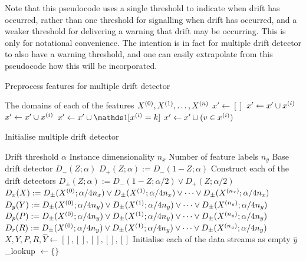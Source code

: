 Note that this pseudocode  uses a single threshold to indicate when drift has occurred, rather than one threshold for signalling when drift has occurred, and a weaker threshold for delivering a warning that drift may be occurring. This is only for notational convenience. The intention is in fact for multiple drift detector to also have a warning threshold, and one can easily extrapolate from this pseudocode how this will be incorporated.

\begin{algorithm}
    \caption{Preprocess features for multiple drift detector}
    \label{alg:mdd_preprocess}
    \begin{algorithmic}
        \Require The domains of each of the features $X^{(0)},X^{(1)},\dots,X^{(n)}$
        \State $x' \gets []$
            \State $x' \gets x' \cup x^{(i)}$
            \State $x' \gets x' \cup x^{(i)}$
              \State $x' \gets x' \cup \id{\x{i}=k}$
            \EndFor
              \State $x' \gets x' \cup (v\in x^{(i)})$
            \EndFor
          \EndIf
        \EndFor
      \EndFunction
    \end{algorithmic}
\end{algorithm}

\begin{algorithm}
    \caption{Initialise multiple drift detector}
    \label{alg:mdd_init}
    \begin{algorithmic}
        \Require Drift threshold $\alpha$
        \Require Instance dimensionality $n_x$
        \Require Number of feature labels $n_y$
        \Require Base drift detector $D_-(Z;\alpha)$
        \State $D_+(Z;\alpha) := D_-(1-Z;\alpha)$
        \Comment Construct each of the drift detectors
        \State $D_\pm(Z;\alpha) := D_-(1-Z;\alpha/2) \vee D_+(Z;\alpha/2)$
        \State $D_x(X) := D_\pm(X^{(0)};\alpha/4n_x) \vee D_\pm(X^{(1)};\alpha/4n_x) \vee \dots \vee D_\pm(X^{(n_x)};\alpha/4n_x)$
        \State $D_y(Y) := D_\pm(X^{(0)};\alpha/4n_y) \vee D_\pm(X^{(1)};\alpha/4n_y) \vee \dots \vee D_\pm(X^{(n_y)};\alpha/4n_y)$
        \State $D_p(P) := D_\pm(X^{(0)};\alpha/4n_y) \vee D_\pm(X^{(1)};\alpha/4n_y) \vee \dots \vee D_\pm(X^{(n_y)};\alpha/4n_y)$
        \State $D_r(R) := D_\pm(X^{(0)};\alpha/4n_y) \vee D_\pm(X^{(1)};\alpha/4n_y) \vee \dots \vee D_\pm(X^{(n_y)};\alpha/4n_y)$
        \State $X, Y, P, R, \hat{Y} \gets [], [], [], [], []$
        \Comment Initialise each of the data streams as empty
        \State $\hat{y}$\_lookup $\gets \{\}$
      \EndFunction
    \end{algorithmic}
\end{algorithm}

